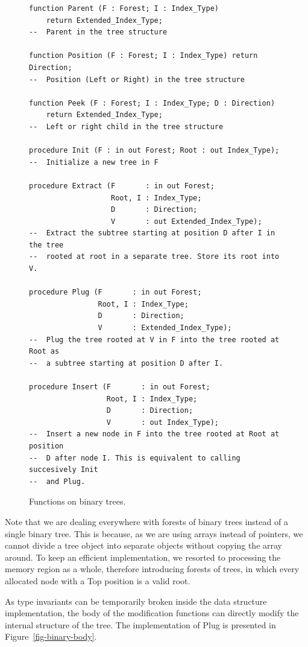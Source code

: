 \documentclass[11pt,a4paper]{article}
\begin{document}
\begin{figure}[ht]
\begin{small}
\begin{lstlisting}
function Parent (F : Forest; I : Index_Type)
    return Extended_Index_Type;
--  Parent in the tree structure

function Position (F : Forest; I : Index_Type) return Direction;
--  Position (Left or Right) in the tree structure

function Peek (F : Forest; I : Index_Type; D : Direction)
    return Extended_Index_Type;
--  Left or right child in the tree structure

procedure Init (F : in out Forest; Root : out Index_Type);
--  Initialize a new tree in F

procedure Extract (F       : in out Forest;
                   Root, I : Index_Type;
                   D       : Direction;
                   V       : out Extended_Index_Type);
--  Extract the subtree starting at position D after I in the tree
--  rooted at root in a separate tree. Store its root into V.

procedure Plug (F       : in out Forest;
                Root, I : Index_Type;
                D       : Direction;
                V       : Extended_Index_Type);
--  Plug the tree rooted at V in F into the tree rooted at Root as
--  a subtree starting at position D after I.

procedure Insert (F       : in out Forest;
                  Root, I : Index_Type;
                  D       : Direction;
                  V       : out Index_Type);
--  Insert a new node in F into the tree rooted at Root at position
--  D after node I. This is equivalent to calling succesively Init
--  and Plug.
\end{lstlisting}
\end{small}
\caption{\label{fig-binary-fun} Functions on binary trees.}
\end{figure}

Note that we are dealing everywhere with forests of binary trees instead of a single
binary tree. This is because, as we are using arrays instead of pointers, we cannot divide a
tree object into separate objects without copying the array around. To keep an efficient
implementation, we resorted to processing the memory region as a whole, therefore
introducing forests of trees, in which every allocated node with a Top position is a
valid root.

As type invariants can be temporarily broken inside the data structure implementation, the body
of the modification functions can directly modify the internal structure of the tree. The implementation
of Plug is presented in Figure~\ref{fig-binary-body}.
\end{document}
